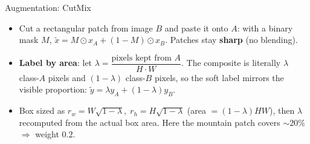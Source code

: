 \begin{frame}{Augmentation: CutMix}
  \begin{center}
  \end{center}
  \vspace{0.4em}
  \begin{itemize}
    \item Cut a rectangular patch from image $B$ and paste it onto $A$: with a binary mask $M$, \;$\tilde{x}=M\odot x_A+(1{-}M)\odot x_B$. Patches stay \textbf{sharp} (no blending).
    \item \textbf{Label by area}: let $\lambda=\dfrac{\text{pixels kept from }A}{H\cdot W}$. The composite is literally $\lambda$ class-$A$ pixels and $(1{-}\lambda)$ class-$B$ pixels, so the soft label mirrors the visible proportion: $\tilde{y}=\lambda y_A+(1{-}\lambda)y_B$.
    \item Box sized as $r_w{=}W\sqrt{1{-}\lambda},\; r_h{=}H\sqrt{1{-}\lambda}$ (area $=(1{-}\lambda)HW$), then $\lambda$ recomputed from the actual box area. Here the mountain patch covers $\sim20\%$ $\Rightarrow$ weight $0.2$.
  \end{itemize}
\end{frame}

